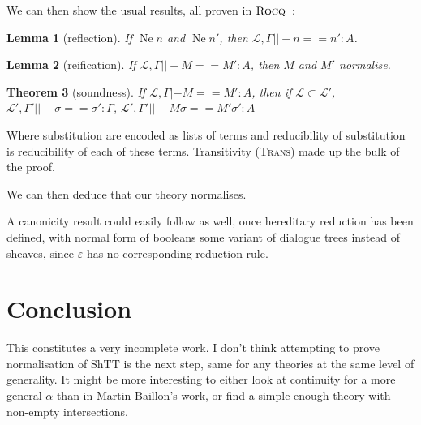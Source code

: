 \documentclass[11pt]{article}
\newtheorem{theorem}{Theorem}[section]
\newtheorem{lemma}[theorem]{Lemma}
\DeclareMathOperator{\neu}{Ne}
\newcommand{\0}{\mathbf{0}}
\newcommand{\1}{\mathbf{1}}
\newcommand{\tctx}{\Gamma}
\newcommand{\fctx}{\mathcal{L}}
\newcommand{\rocq}{\textsc{Rocq}}
\begin{document}
We can then show the usual results, all proven in $\rocq$~:

\begin{lemma}[reflection]
    If $\neu n$ and $\neu n'$, then $\fctx,\tctx ||- n == n' : A$.
\end{lemma}
\begin{lemma}[reification]
    If $\fctx,\tctx ||- M == M' : A$, then $M$ and $M'$ normalise.
\end{lemma}

\begin{theorem}[soundness]
    If $\fctx,\tctx |- M == M' : A$, then if $\fctx \subset \fctx'$, $\fctx',\tctx'||-\sigma == \sigma' : \Gamma$, $\fctx',\tctx' ||- M\sigma == M'\sigma' : A$
\end{theorem}
Where substitution are encoded as lists of terms and reducibility of substitution is reducibility of each of these terms. Transitivity (\textsc{Trans}) made up the bulk of the proof.

We can then deduce that our theory normalises.

A canonicity result could easily follow as well, once hereditary reduction has been defined, with normal form of booleans some variant of dialogue trees instead of sheaves, since $\varepsilon$ has no corresponding reduction rule.
\section{Conclusion}

This constitutes a very incomplete work. I don't think attempting to prove normalisation of ShTT is the next step, same for any theories at the same level of generality. It might be more interesting to either look at continuity for a more general $\alpha$ than in Martin Baillon's work, or find a simple enough theory with non-empty intersections.

%
%
%

\printbibliography
\end{document}
